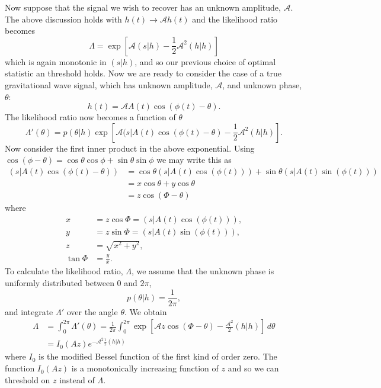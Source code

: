 Now suppose that the signal we wish to recover has an unknown amplitude,
$\mathcal{A}$. The above discussion holds with $h(t) \rightarrow
\mathcal{A}h(t)$ and the likelihood ratio becomes
\begin{equation}
\Lambda = \exp\left[\mathcal{A}(s|h) - \frac{1}{2}\mathcal{A}^2(h|h)\right]
\end{equation}
which is again monotonic in $(s|h)$, and so our previous choice of optimal
statistic an threshold holds. Now we are ready to consider the case of a true
gravitational wave signal, which has unknown amplitude, $\mathcal{A}$, and
unknown phase, $\theta$:
\begin{equation}
h(t) = \mathcal{A} A(t) \cos(\phi(t) - \theta).
\end{equation}
The likelihood ratio now becomes a function of $\theta$
\begin{equation}
\Lambda'(\theta) = 
p(\theta|h) \exp\left[\mathcal{A}(s|A(t)\cos(\phi(t) - \theta) -
\frac{1}{2}\mathcal{A}^2(h|h)\right].
\end{equation}
Now consider the first inner product in the above exponential. Using
$\cos(\phi - \theta) = \cos\theta\cos\phi + \sin\theta\sin\phi$ we may write
this as
\begin{equation}
\begin{split}
\left(s\big|A(t)\cos(\phi(t) - \theta)\right)  &= 
\cos\theta \left(s\big|A(t)\cos(\phi(t))\right) + \sin\theta \left(s\big|A(t)\sin(\phi(t))\right)  \\
& = x\cos\theta + y\cos\theta \\
& = z\cos(\Phi - \theta)
\end{split}
\end{equation}
where
\begin{align}
x &= z\cos\Phi = \left(s\big|A(t)\cos(\phi(t))\right), \\
y &= z\sin\Phi = \left(s\big|A(t)\sin(\phi(t))\right), \\
z &= \sqrt{x^2 + y^2}, \\
\tan \Phi &= \frac{y}{x}.
\end{align}
To calculate the likelihood ratio, $\Lambda$, we assume that the unknown phase
is uniformly distributed between $0$ and $2\pi$,
\begin{equation}
p(\theta|h) = \frac{1}{2\pi},
\end{equation}
and integrate $\Lambda'$ over the angle $\theta$. We obtain
\begin{equation}
\begin{split}
\Lambda &= \int_0^{2\pi} \Lambda'(\theta) 
= \frac{1}{2\pi}\int_0^{2\pi}\exp\left[\mathcal{A}z\cos(\Phi - \theta) -
\frac{\mathcal{A}^2}{2}(h|h)\right] \,d\theta \\
&= I_0(Az) e^{-\mathcal{A}^2\frac{1}{2}(h|h)}
\end{split}
\end{equation}
where $I_0$ is the modified Bessel function of the first kind of order zero.
The function $I_0(Az)$ is a monotonically increasing function of $z$ and so we
can threshold on $z$ instead of $\Lambda$. 

